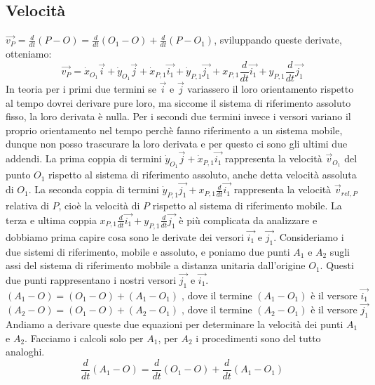 \subsection{Velocità}
$\vec{v_P} = \frac{d}{dt} (P-O) = \frac{d}{dt} (O_1 - O) + \frac{d}{dt} (P-O_1)$, sviluppando queste derivate, otteniamo: 
\[
    \vec{v_P} = 
        \dot{x}_{O_1}\vec{i} + 
        \dot{y}_{O_1} \vec{j} + 
        \dot{x}_{P,1} \vec{i_1} + 
        \dot{y}_{P,1} \vec{j_1} + 
        x_{P,1} \frac{d}{dt}\vec{i_1} + 
        y_{P,1} \frac{d}{dt} \vec{j_1}
\]
In teoria per i primi due termini se $\vec{i}$ e $\vec{j}$ variassero il loro orientamento rispetto al tempo dovrei derivare pure loro, ma siccome il sistema di riferimento assoluto fisso, la loro derivata è nulla. Per i secondi due termini invece i versori variano il proprio orientamento nel tempo perchè fanno riferimento a un sistema mobile, dunque non posso trascurare la loro derivata e per questo ci sono gli ultimi due addendi.\newline
La prima coppia di termini $\dot{y}_{O_1} \vec{j} + \dot{x}_{P,1} \vec{i_1}$ rappresenta la velocità $\vec{v}_{O_1}$ del punto $O_1$ rispetto al sistema di riferimento assoluto, anche detta velocità assoluta di $O_1$.\newline
La seconda coppia di termini $\dot{y}_{P,1} \vec{j_1} + x_{P,1} \frac{d}{dt}\vec{i_1}$ rappresenta la velocità $\vec{v}_{rel, P}$ relativa di $P$, cioè la velocità di $P$ rispetto al sistema di riferimento mobile.\newline
La terza e ultima coppia $x_{P,1} \frac{d}{dt}\vec{i_1} + y_{P,1} \frac{d}{dt} \vec{j_1}$ è più complicata da analizzare e dobbiamo prima capire cosa sono le derivate dei versori $\vec{i_1}$ e $\vec{j_1}$.\newline
Consideriamo i due sistemi di riferimento, mobile e assoluto, e poniamo due punti $A_1$ e $A_2$ sugli assi del sistema di riferimento mobbile a distanza unitaria dall'origine $O_1$. Questi due punti rappresentano i nostri versori $\vec{j_1}$ e $\vec{i_1}$.
\[
    (A_1 - O) = (O_1-O) + (A_1 - O_1) \;\text{, dove il termine $(A_1-O_1)$ è il versore $\vec{i_1}$}\;
\]
\[
    (A_2 - O) = (O_1-O) + (A_2 - O_1) \;\text{, dove il termine $(A_2-O_1)$ è il versore $\vec{j_1}$}\;
\]
Andiamo a derivare queste due equazioni per determinare la velocità dei punti $A_1$ e $A_2$. Facciamo i calcoli solo per $A_1$, per $A_2$ i procedimenti sono del tutto analoghi.
\[
    \frac{d}{dt}(A_1-O) = \frac{d}{dt}(O_1 - O) + \frac{d}{dt}(A_1 -O_1)
\]
